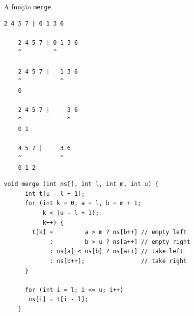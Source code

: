 \documentclass{beamer}
\begin{document}
\begin{frame}{A função \texttt{merge}}

  \begin{lstlisting}[style=code]
    2 4 5 7 | 0 1 3 6

    2 4 5 7 | 0 1 3 6
    ^         ^

    2 4 5 7 |   1 3 6
    ^           ^
    0

    2 4 5 7 |     3 6
    ^             ^
    0 1

    4 5 7 |     3 6
    ^           ^
    0 1 2
  \end{lstlisting}

  \framebreak

  \begin{lstlisting}[style=normalc,caption=src/merge.c]
    void merge (int ns[], int l, int m, int u) {
      int t[u - l + 1];
      for (int k = 0, a = l, b = m + 1;
           k < (u - l + 1);
           k++) {
        t[k] =         a > m ? ns[b++] // empty left
             :         b > u ? ns[a++] // empty right
             : ns[a] < ns[b] ? ns[a++] // take left 
             : ns[b++];                // take right
      }
      
      for (int i = l; i <= u; i++)
       ns[i] = t[i - l];
    }
  \end{lstlisting}

\end{frame}
\end{document}
